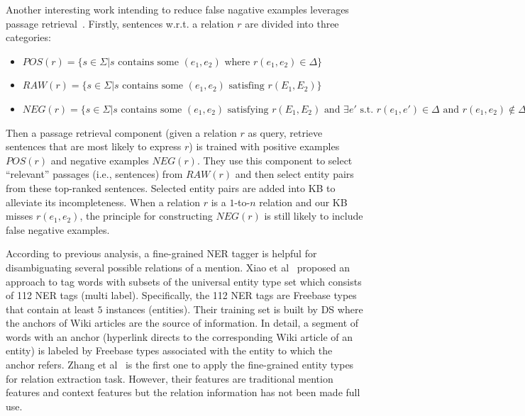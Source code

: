 \documentclass[10pt]{article} %
\theoremstyle{definition}
\theoremstyle{definition}
\begin{document}
Another interesting work intending to reduce false nagative examples leverages passage retrieval~\cite{passageretrieval}. 
Firstly, sentences w.r.t. a relation $r$ are divided into three categories: 
\begin{itemize}
\item $POS(r)=\{s\in\Sigma\vert{}s\text{ contains some }(e_1,e_2)\text{ where }r(e_1,e_2)\in\Delta\}$ 
\item $RAW(r)=\{s\in\Sigma\vert{}s\text{ contains some }(e_1,e_2)\text{ satisfing }r(E_1, E_2)\}$ 
\item $NEG(r)=\{s\in\Sigma\vert{}s\text{ contains some }(e_1,e_2)\text{ satisfying }r(E_1, E_2)\text{ and }\exists{}e'\text{ s.t. }r(e_1,e')\in\Delta\text{ and }r(e_1,e_2)\notin\Delta\}$ 
\end{itemize}
Then a passage retrieval component (given a relation $r$ as query, retrieve sentences that are most likely to express $r$) is trained with positive examples $POS(r)$ and negative examples $NEG(r)$. 
They use this component to select ``relevant'' passages (i.e., sentences) from $RAW(r)$ and then select entity pairs from these top-ranked sentences. 
Selected entity pairs are added into KB to alleviate its incompleteness. 
When a relation $r$ is a $1$-to-$n$ relation and our KB misses $r(e_1, e_2)$, the principle for constructing $NEG(r)$ is still likely to include false negative examples. 



According to previous analysis, a fine-grained NER tagger is helpful for disambiguating several possible relations of a mention. 
Xiao et al~\cite{112nertag} proposed an approach to tag words with subsets of the universal entity type set which consists of 112 NER tags (multi label). 
Specifically, the 112 NER tags are Freebase types that contain at least $5$ instances (entities). 
Their training set is built by DS where the anchors of Wiki articles are the source of information. 
In detail, a segment of words with an anchor (hyperlink directs to the corresponding Wiki article of an entity) is labeled by Freebase types associated with the entity to which the anchor refers. 
Zhang et al~\cite{xingxing} is the first one to apply the fine-grained entity types for relation extraction task. 
However, their features are traditional mention features and context features but the relation information has not been made full use. 
\end{document}
